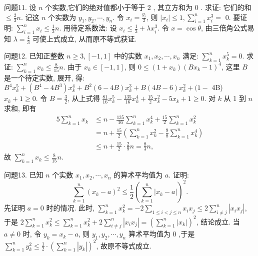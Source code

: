 问题11. 设 $n$ 个实数,它们的绝对值都小于等于 2 , 其立方和为 0 . 求证: 它们的和 $\leqslant \frac{2}{3} n$.
记这 $n$ 个实数为 $y_1, y_2, \cdots, y_n$. 令 $x_i=\frac{y_i}{2}$, 则 $\left|x_i\right| \leqslant 1, \sum_{i=1}^n x_i^3=$ 0. 要证明: $\sum_{i=1}^n x_i \leqslant \frac{1}{3} n$.
用待定系数法: 设 $x_i \leqslant \frac{1}{3}+\lambda x_i^3$. 令 $x=\cos \theta$, 由三倍角公式易知 $\lambda=\frac{4}{3}$ 可使上式成立, 从而原不等式获证.



问题12. 已知正整数 $n \geqslant 3,[-1,1]$ 中的实数 $x_1, x_2, \cdots, x_n$ 满足: $\sum_{k=1}^n x_k^5=0$. 求证: $\sum_{k=1}^n x_k \leqslant \frac{8}{15} n$.
由于 $x_k \in[-1,1]$, 则 $0 \leqslant\left(1+x_k\right)\left(B x_k-1\right)^4$, 这里 $B$ 是一个待定实数, 展开, 得: $B^4 x_k^5+\left(B^4-4 B^3\right) x_k^4+B^2(6-4 B) x_k^3+B(4 B-6) x_k^2+(1-$ 4B) $x_k+1 \geqslant 0$.
令 $B=\frac{3}{2}$, 从上式得 $\frac{81}{16} x_k^5-\frac{135}{16} x_k^4+\frac{15}{2} x_k^2-5 x_k+1 \geqslant 0$. 对 $k$ 从 1 到 $n$ 求和, 即有
$$
\begin{aligned}
5 \sum_{k=1}^n x_k & \leqslant n-\frac{135}{16} \sum_{k=1}^n x_k^4+\frac{15}{2} \sum_{k=1}^n x_k^2 \\
& =n+\frac{15}{2}\left(\sum_{k=1}^n x_k^2-\frac{9}{8} \sum_{k=1}^n x_k^4\right) \\
& \leqslant n+\frac{15}{2} \cdot \frac{2}{9} n=\frac{8}{3} n,
\end{aligned}
$$
故 $\sum_{k=1}^n x_k \leqslant \frac{8}{15} n$.



问题13. 已知 $n$ 个实数 $x_1, x_2, \cdots, x_n$ 的算术平均值为 $a$. 证明:
$$
\sum_{k=1}^n\left(x_k-a\right)^2 \leqslant \frac{1}{2}\left(\sum_{k=1}^n\left|x_k-a\right|\right)^2 .
$$
先证明 $a=0$ 时的情况.
此时, $\sum_{k=1}^n x_k^2=-2 \sum_{1 \leqslant i<j \leqslant n} x_i x_j \leqslant 2 \sum_{i \neq j}^n\left|x_i x_j\right|$, 于是 $2 \sum_{k=1}^n x_k^2 \leqslant \sum_{k=1}^n x_k^2+2 \sum_{i \neq j}^n\left|x_i x_j\right|=\left(\sum_{k=1}^n\left|x_k\right|\right)^2$, 结论成立.
当 $a \neq 0$ 时, 令 $y_k=x_k-a$, 则 $y_1, y_2, \cdots, y_n$ 算术平均值为 0 ,于是 $\sum_{k=1}^n y_k^2 \leqslant \frac{1}{2} \cdot\left(\sum_{k=1}^n\left|y_k\right|\right)^2$, 故原不等式成立.



